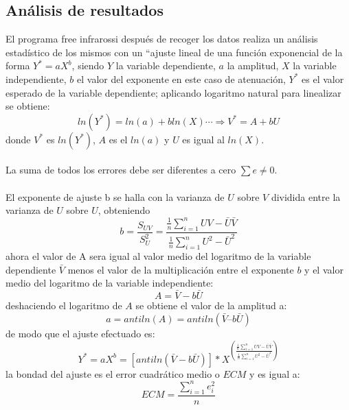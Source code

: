 \documentclass[12]{article}
\begin{document}
\begin{multicols}{2}
\section{Análisis de resultados}
El programa free infrarossi después de recoger los datos realiza un análisis estadístico de los mismos con un “ajuste lineal de una función exponencial de la forma $Y^{*} = aX^{b}$, siendo $Y$ la variable dependiente, $a$ la amplitud, $X$ la variable independiente,  $b$ el valor del exponente en este caso de atenuación, $Y^{*}$ es el valor esperado de la variable dependiente; aplicando logaritmo natural para linealizar se obtiene:
\begin{equation}
ln ( Y^{*}) = ln (a) + bln(X)  \cdots \Longrightarrow V^{*} = A + bU
\end{equation} 
donde $V^{*}$ es $ln(Y^{*})$, $A $ es el $ln(a)$ y $U$ es igual al $ln(X)$. \\\\
La suma de  todos los errores debe ser diferentes a cero $\sum e \neq 0$. \\\\
El exponente de ajuste b se halla con la varianza de $U$ sobre $V$  dividida entre la varianza de $U$ sobre $U$, obteniendo
\begin{equation}
b = \frac{S_{UV}}{S^{2} _{U}} =  \frac{\frac{1}{n} \sum_{i=1}^{n} UV - \bar{U} \bar{V}}{\frac{1}{n} \sum _{i=1}^{n} U^{2} - \bar{U}^2}
\end{equation}
ahora el valor de A sera igual al valor medio del logaritmo de la variable dependiente $\bar{V}$ menos el valor de la multiplicación entre el exponente $b$ y el valor medio del logaritmo de la variable independiente:
\begin{equation}
A = \bar{V} -b\bar{U}
\end{equation}
deshaciendo el logaritmo de $A$  se obtiene el valor de la amplitud a:
\begin{equation}
a = antiln(A) = antiln(\bar{V} – b\bar{U})
\end{equation}
de modo que el ajuste efectuado es:
\begin{equation}
Y^{*} =  aX^{b}  = [antiln(\bar{V} - b\bar{U})]*X^{ \left(\frac{\frac{1}{n} \sum_{i=1}^{n} UV - \bar{U} \bar{V}}{\frac{1}{n} \sum _{i=1}^{n} U^{2} - \bar{U}^{2}}\right)}
\end{equation}
la bondad del ajuste es el error cuadrático medio o $ECM$ y es igual a: 
\begin{equation}
ECM = \frac{\sum_{i=1}^{n}e_{i}^{2}}{n}
\end{equation}

\end{multicols}
\end{document}

